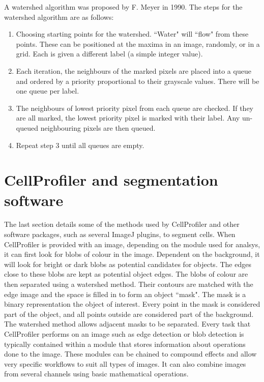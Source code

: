 A watershed algorithm was proposed by F. Meyer in 1990. The steps for the watershed algorithm are as follows:
\begin{enumerate}
	\item Choosing starting points for the watershed. ``Water" will ``flow" from these points. These can be positioned at the maxima in an image, randomly, or in a grid. Each is given a different label (a simple integer value).
	\item Each iteration, the neighbours of the marked pixels are placed into a queue and ordered by a priority proportional to their grayscale values. There will be one queue per label.
	\item The neighbours of lowest priority pixel from each queue are checked. If they are all marked, the lowest priority pixel is marked with their label. Any un-queued neighbouring pixels are then queued.
	\item Repeat step 3 until all queues are empty.
\end{enumerate}

\section{CellProfiler and segmentation software}

The last section details some of the methods used by CellProfiler and other software packages, such as several ImageJ plugins, to segment cells. When CellProfiler is provided with an image, depending on the module used for analsys, it can first look for blobs of colour in the image. Dependent on the background, it will look for bright or dark blobs as potential candidates for objects. The edges close to these blobs are kept as potential object edges. The blobs of colour are then separated using a watershed method. Their contours are matched with the edge image and the space is filled in to form an object ``mask". The mask is a binary representation the object of interest. Every point in the mask is considered part of the object, and all points outside are considered part of the background. The watershed method allows adjacent masks to be separated. Every task that CellProfiler performs on an image such as edge detection or blob detection is typically contained within a module that stores information about operations done to the image. These modules can be chained to compound effects and allow very specific workflows to suit all types of images. It can also combine images from several channels using basic mathematical operations.

